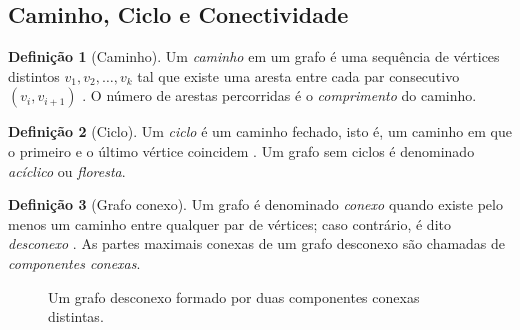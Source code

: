 \documentclass[
  12pt,
  oneside,
  a4paper,
  english,
  brazilian
  ]{abntex2}
\theoremstyle{definition}
\newtheorem{definicao}{Definição}[chapter]
\begin{document}
\subsection{Caminho, Ciclo e Conectividade}

\begin{definicao}[Caminho]
  Um \textit{caminho} em um grafo é uma sequência de vértices distintos
  $v_1, v_2, \ldots, v_k$ tal que existe uma aresta entre cada par consecutivo
  $(v_i, v_{i+1})$ \cite{diestel2017}. O número de arestas percorridas é o
  \textit{comprimento} do caminho.
\end{definicao}

\begin{definicao}[Ciclo]
  Um \textit{ciclo} é um caminho fechado, isto é, um caminho em que o primeiro
  e o último vértice coincidem \cite{boaventura2009}. Um grafo sem ciclos é
  denominado \textit{acíclico} ou \textit{floresta}.
\end{definicao}

\begin{definicao}[Grafo conexo]
  Um grafo é denominado \textit{conexo} quando existe pelo menos um caminho
  entre qualquer par de vértices; caso contrário, é dito \textit{desconexo}
  \cite{rosen2012}. As partes maximais conexas de um grafo desconexo são
  chamadas de \textit{componentes conexas}.
\end{definicao}

\begin{figure}[htbp]
    \centering
    \caption{Um grafo desconexo formado por duas componentes conexas distintas.}
    \label{fig:conectividade}
\end{figure}
\end{document}
